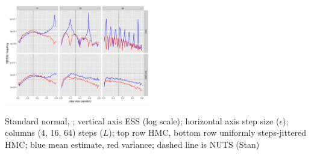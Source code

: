 \documentclass[10pt]{report}
\begin{document}
\begin{center}
  \vspace*{-4pt}
  \includegraphics[width=2.5in]{img/hmc-harmonics.png}
\end{center}
\begin{subitemize}
  \vspace*{-8pt}
\item Standard normal, ;
  vertical axis ESS (log scale); horizontal axis step size
  ($\epsilon$); columns (4, 16, 64) steps ($L$);
  top row HMC, bottom row uniformly steps-jittered HMC;
  blue mean estimate, red variance; dashed line is NUTS (Stan)
\end{subitemize}
\end{document}
